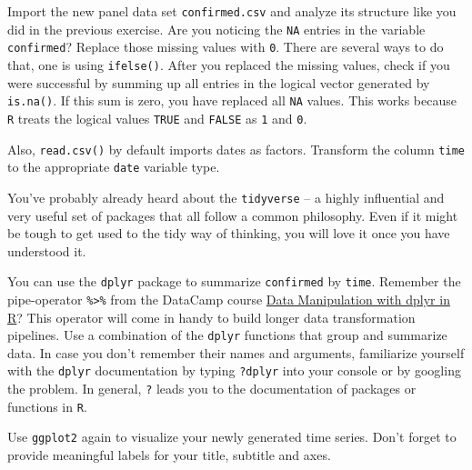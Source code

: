 \documentclass[
  11pt,
]{article}
\newenvironment{tips}[1]
  {
  \begin{itemize}
  \footnotesize
  \renewcommand{\labelitemi}{
    \raisebox{-.7\height}[0pt][0pt]{
      {\setkeys{Gin}{width=3em,keepaspectratio}
        \texttt{[image: images/\#1.png]}}
    }
  }
  \setlength{\fboxsep}{1em}
  \begin{rbox}
  \item
  }
  {
  \end{rbox}
  \end{itemize}
  }
\begin{document}
\begin{tips}r

Import the new panel data set \texttt{confirmed.csv} and analyze its structure
like you did in the previous exercise. Are you noticing the \texttt{NA} entries in the variable \texttt{confirmed}? Replace those missing values with \texttt{0}. There are several ways to do that, one is using \texttt{ifelse()}. After you replaced the missing values, check if you were successful by summing up all entries in the logical vector generated by \texttt{is.na()}. If this sum is zero, you have replaced all \texttt{NA} values. This works because \texttt{R} treats the logical values \texttt{TRUE} and \texttt{FALSE} as \texttt{1} and \texttt{0}.

Also, \texttt{read.csv()} by default imports dates as factors. Transform the column \texttt{time} to the appropriate \texttt{date} variable type.

You've probably already heard about the \texttt{tidyverse} -- a highly influential and very useful set of packages that all follow a common philosophy. Even if it might be tough to get used to the tidy way of thinking, you will love it once you have understood it.

You can use the \texttt{dplyr} package to summarize \texttt{confirmed} by \texttt{time}. Remember the pipe-operator \texttt{\%\textgreater{}\%} from the DataCamp course \href{https://www.datacamp.com/courses/data-manipulation-with-dplyr-in-r}{Data Manipulation with dplyr in R}? This operator will come in handy to build longer data transformation pipelines. Use a combination of the \texttt{dplyr} functions that group and summarize data. In case you don't remember their names and arguments, familiarize yourself with the \texttt{dplyr} documentation by typing \texttt{?dplyr} into your console or by googling the problem. In general, \texttt{?} leads you to the documentation of packages or functions in \texttt{R}.

Use \texttt{ggplot2} again to visualize your newly generated time series. Don't forget to provide meaningful labels for your title, subtitle and axes.

\end{tips}
\end{document}
